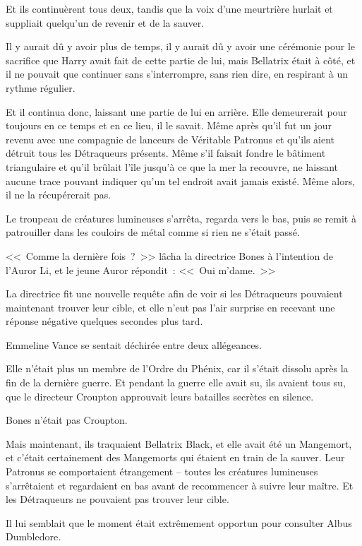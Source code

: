 Et ils continuèrent tous deux, tandis que la voix d'une meurtrière hurlait et suppliait quelqu'un de revenir et de la sauver.

Il y aurait dû y avoir plus de temps, il y aurait dû y avoir une cérémonie pour le sacrifice que Harry avait fait de cette partie de lui, mais Bellatrix était à côté, et il ne pouvait que continuer sans s'interrompre, sans rien dire, en respirant à un rythme régulier.

Et il continua donc, laissant une partie de lui en arrière. Elle demeurerait pour toujours en ce temps et en ce lieu, il le savait. Même après qu'il fut un jour revenu avec une compagnie de lanceurs de Véritable Patronus et qu'ils aient détruit tous les Détraqueurs présents. Même s'il faisait fondre le bâtiment triangulaire et qu'il brûlait l'île jusqu'à ce que la mer la recouvre, ne laissant aucune trace pouvant indiquer qu'un tel endroit avait jamais existé. Même alors, il ne la récupérerait pas.

\later

Le troupeau de créatures lumineuses s'arrêta, regarda vers le bas, puis se remit à patrouiller dans les couloirs de métal comme si rien ne s'était passé.

<<~Comme la dernière fois~?~>> lâcha la directrice Bones à l'intention de l'Auror Li, et le jeune Auror répondit~: <<~Oui m'dame.~>>

La directrice fit une nouvelle requête afin de voir si les Détraqueurs pouvaient maintenant trouver leur cible, et elle n'eut pas l'air surprise en recevant une réponse négative quelques secondes plus tard.

Emmeline Vance se sentait déchirée entre deux allégeances.

Elle n'était plus un membre de l'Ordre du Phénix, car il s'était dissolu après la fin de la dernière guerre. Et pendant la guerre elle avait su, ils avaient tous su, que le directeur Croupton approuvait leurs batailles secrètes en silence.

Bones n'était pas Croupton.

Mais maintenant, ils traquaient Bellatrix Black, et elle avait été un Mangemort, et c'était certainement des Mangemorts qui étaient en train de la sauver. Leur Patronus se comportaient étrangement -- toutes les créatures lumineuses s'arrêtaient et regardaient en bas avant de recommencer à suivre leur maître. Et les Détraqueurs ne pouvaient pas trouver leur cible.

Il lui semblait que le moment était extrêmement opportun pour consulter Albus Dumbledore.

